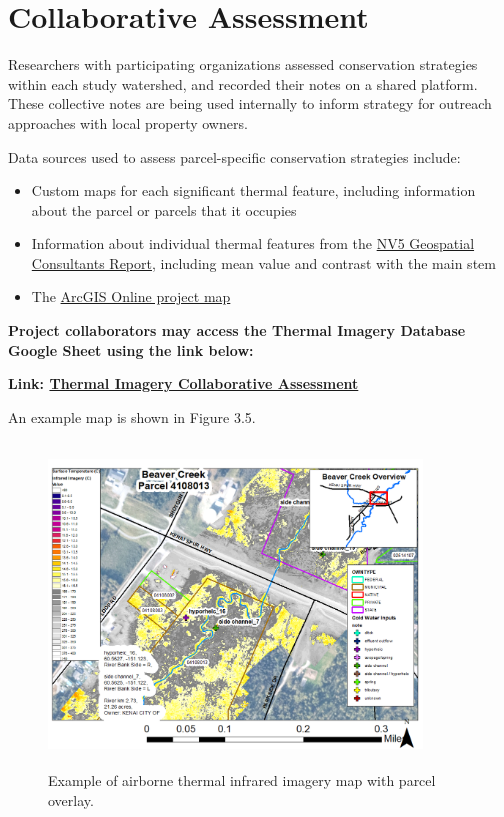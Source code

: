 \documentclass[
  letterpaper,
  DIV=11,
  numbers=noendperiod]{scrreprt}
\begin{document}
\hypertarget{collaborative-assessment}{%
\section{Collaborative Assessment}\label{collaborative-assessment}}

Researchers with participating organizations assessed conservation
strategies within each study watershed, and recorded their notes on a
shared platform. These collective notes are being used internally to
inform strategy for outreach approaches with local property owners.

Data sources used to assess parcel-specific conservation strategies
include:

\begin{itemize}
\item
  Custom maps for each significant thermal feature, including
  information about the parcel or parcels that it occupies
\item
  Information about individual thermal features from the
  \href{https://github.com/Kenai-Watershed-Forum/kenai_thermal_imagery/blob/master/documents/TIR_Technical_Data_Report_Kenai_Rivers_20210107.pdf}{NV5
  Geospatial Consultants Report}, including mean value and contrast with
  the main stem
\item
  The \href{https://arcg.is/fzn14}{ArcGIS Online project map}
\end{itemize}

\textbf{Project collaborators may access the Thermal Imagery Database
Google Sheet using the link below:}

\textbf{Link:
\href{https://docs.google.com/document/d/1TZcTMBOL6WDCyvOODZlGeuCd-1sPWzYsurWtx7MJoUE/edit}{Thermal
Imagery Collaborative Assessment}}

An example map is shown in Figure 3.5.

\begin{figure}

{\centering \includegraphics[width=3.90625in,height=3.38542in]{./images/Beaver_Crk4.png}

}

\caption{\label{fig-example-map}Example of airborne thermal infrared
imagery map with parcel overlay.}

\end{figure}
\end{document}
